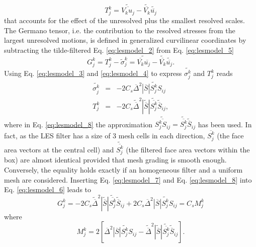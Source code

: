\documentclass[journal abbreviation, manuscript]{copernicus}
\begin{document}
\begin{equation}
	T_j^k = \widetilde{\overline{V_ku_j}} - \widetilde{\overline{V_k}}\widetilde{\overline{u_j}} \label{eq:lesmodel_5}
\end{equation}
that accounts for the effect of the unresolved plus the smallest resolved scales. The Germano tensor, i.e. the contribution to the resolved stresses from the largest unresolved motions, is defined in generalized curvilinear coordinates by subtracting the tilde-filtered Eq. \ref{eq:lesmodel_2} from Eq. \ref{eq:lesmodel_5}
\begin{equation}
	G_j^k = T_j^k - \widetilde{\sigma}_j^k = \widetilde{\overline{V_k}\overline{u_j}} - \widetilde{\overline{V_k}}\widetilde{\overline{u_j}} . \label{eq:lesmodel_6}
\end{equation}
Using Eq. \ref{eq:lesmodel_3} and \ref{eq:lesmodel_4} to express $\widetilde{\sigma_j^k}$ and $T_j^k$ reads
\begin{eqnarray}
	\widetilde{\sigma_j^k} &=& -2C_s\overline{\Delta}^2\widetilde{\mathit{|\overline{S}|S_j^kS_{ij}}} \label{eq:lesmodel_7} \\
	T_j^k &=& -2C_s\widetilde{\overline{\Delta}}^2|\widetilde{\overline{S}}|\widetilde{\overline{S_j^k}}\widetilde{\overline{S}}_{ij}, \label{eq:lesmodel_8}
\end{eqnarray}
where in Eq. \ref{eq:lesmodel_8} the approximation $\widetilde{\overline{S_j^kS_{ij}}} = \widetilde{\overline{S_j^k}}\widetilde{\overline{S}}_{ij}$ has been used. In fact,  as the LES filter has a size of 3 mesh cells in each
direction, $\overline{S_j^k}$ (the face area vectors at the central cell) and
$\widetilde{\overline{S_j^k}}$ (the filtered face area vectors within the box)
are almost identical provided that mesh grading is smooth enough. Conversely, the equality holds exactly if an homogeneous filter and a uniform mesh are considered. Inserting Eq. \ref{eq:lesmodel_7} and Eq. \ref{eq:lesmodel_8} into Eq. \ref{eq:lesmodel_6} leads to
\begin{equation}
	G_j^k = -2C_s\widetilde{\overline{\Delta}}^2|\widetilde{\overline{S}}|\widetilde{\overline{S_j^k}}\widetilde{\overline{S}}_{ij} + 2C_s\overline{\Delta}^2\widetilde{\mathit{|\overline{S}|S_j^kS_{ij}}} = C_s M_j^k
\end{equation}
where
\begin{equation}
	M_j^k = 2\left[ \overline{\Delta}^2\widetilde{\mathit{|\overline{S}|S_j^kS_{ij}}} - \widetilde{\overline{\Delta}}^2|\widetilde{\overline{S}}|\widetilde{\overline{S_j^k}}\widetilde{\overline{S}}_{ij}\right]. \label{eq:lesmodel_9}
\end{equation}
\end{document}
